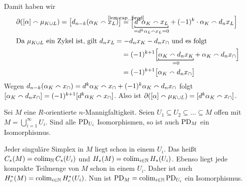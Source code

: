 \begin{beweis}
\begin{align}
	\end{align}
	Damit haben wir
	\begin{align}
		\partial \enbrace*{[\alpha] \capp \mu_{K \cup L}} = \benbrace[\big]{d_{n-k} \enbrace*{\alpha_K \capp x_L}} &\StackTextClap{\ref{lem:cap_prod}}{=}\benbrace[\Big]{\Underbracket{d^k \alpha_K \capp x_L}{=d^k \alpha_L \capp x_L=0} + (-1)^k \cdot {\alpha_K \capp d_n x_L}} \\
		\intertext{Da $\mu_{K \cup L}$ ein Zykel ist, gilt $d_n x_L = - d_n x_K - d_n x_\cap$ und es folgt}
		&= (-1)^{k+1} \benbrace[\Big]{\Underbracket{\alpha_K \capp d_n x_K}{=0} + \alpha_K \capp d_n x_\cap} \\
		&= (-1)^{k+1} \benbrace[\big]{\alpha_K \capp d_n x_\cap}
	\end{align}
	Wegen $d_{n-k}(\alpha_K \capp x_\cap)= d^k \alpha_K \capp x_\cap + (-1)^k \alpha_K \capp d_n x_\cap$ folgt $\benbrace*{\alpha_K \capp d_n x_\cap} = (-1)^{k+1} \benbrace{d^k \alpha_K  \capp x_{\cap}}$.
	Also ist $\partial \enbrace*{[\alpha] \capp \mu_{K \cup L}} = \benbrace{d^k  \alpha_K \capp x_\cap}$.
\end{beweis}

\begin{lemma}[label=lem:abzUeber,{name=[{Mannigfaltigkeit als Vereinigung offener Teilmengen}]}]
	Sei $M$ eine $R$-orientierte $n$-Mannigfaltigkeit. 
	Seien $U_1 \subseteq U_2 \subseteq \ldots \subseteq M$ offen mit $M= \bigcup_{i=1}^\infty U_i$.
	Sind alle $\PD_{U_i}$ Isomorphismen, so ist auch $\PD_M$ ein Isomorphismus.
\end{lemma}
\begin{beweis}
	Jeder singuläre Simplex in $M$ liegt schon in einem $U_i$. 
	Das heißt $C_*(M)=\colim_{\mathbb{N}} C_*(U_i)$ und $H_*(M)= \colim_{i \in \mathbb{N}} H_*(U_i)$.
	Ebenso liegt jede kompakte Teilmenge von $M$ schon in einem $U_i$.
	Daher ist auch $H^*_c(M) = \colim_{i \in \mathbb{N}} H^*_c(U_i)$. 
	Nun ist $\PD_M = \colim_{i \in \mathbb{N}} \PD_{U_i}$ ein Isomorphismus.
\end{beweis}

